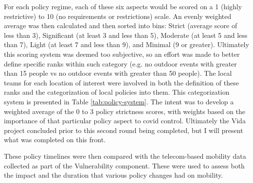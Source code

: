 For each policy regime, each of these six aspects would be scored on a 1 (highly restrictive) to 10 (no requirements or restrictions) scale. An evenly weighted average was then calculated and then sorted into bins: Strict (average score of less than 3), Significant (at least 3 and less than 5), Moderate (at least 5 and less than 7), Light (at least 7 and less than 9), and Minimal (9 or greater). Ultimately this scoring system was deemed too subjective, so an effort was made to better define specific ranks within such category (e.g. no outdoor events with greater than 15 people vs no outdoor events with greater than 50 people). The local teams for each location of interest were involved in both the definition of these ranks and the categorization of local policies into them. This categorization system is presented in Table \ref{tab:policy-system}. The intent was to develop a weighted average of the 0 to 3 policy strictness scores, with weights based on the importance of that particular policy aspect to \ac{covid} control. Ultimately the Vida project concluded prior to this second round being completed, but I will present what was completed on this front.

These policy timelines were then compared with the telecom-based mobility data collected as part of the Vulnerability component. These were used to assess both the impact and the duration that various policy changes had on mobility.

